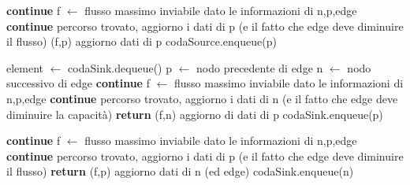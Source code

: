 \documentclass{article}
\begin{document}
\begin{algorithm}
\begin{algorithmic}[1]
\STATE \textbf{continue}
\ELSE
\STATE f $\leftarrow$ flusso massimo inviabile dato le informazioni di n,p,edge
\STATE \textbf{continue}
\ENDIF
\STATE percorso trovato, aggiorno i dati di p (e il fatto che edge deve diminuire il flusso)
\RETURN (f,p)
\ENDIF
\ENDIF
\STATE aggiorno dati di p
\STATE codaSource.enqueue(p)
\ENDIF

\ENDFOR
\ENDIF

\STATE element $\leftarrow$ codaSink.dequeue()
\STATE p $\leftarrow$ nodo precedente di edge
\STATE n $\leftarrow$ nodo successivo di edge
\STATE \textbf{continue}
\ELSE
\STATE f $\leftarrow$ flusso massimo inviabile dato le informazioni di n,p,edge
\STATE \textbf{continue}
\ENDIF
\STATE percorso trovato, aggiorno i dati di n (e il fatto che edge deve diminuire la capacità)
\STATE \textbf{return} (f,n)
\ENDIF
\ENDIF
\STATE aggiorno di dati di p
\STATE codaSink.enqueue(p)
\ENDIF
{}
\end{algorithmic}
\end{algorithm}
\newpage
\begin{algorithm}
\begin{algorithmic}[1]
\STATE \textbf{continue}
\ELSE
\STATE f $\leftarrow$ flusso massimo inviabile dato le informazioni di n,p,edge
\STATE \textbf{continue}
\ENDIF
\STATE percorso trovato, aggiorno i dati di p (e il fatto che edge deve diminuire il flusso)
\STATE \textbf{return} (f,p)
\ENDIF
\ENDIF
\STATE aggiorno dati di n (ed edge)
\STATE codaSink.enqueue(n)
\ENDIF
\ENDFOR
\ENDIF
\ENDWHILE
\end{algorithmic}
\end{algorithm}
\end{document}
